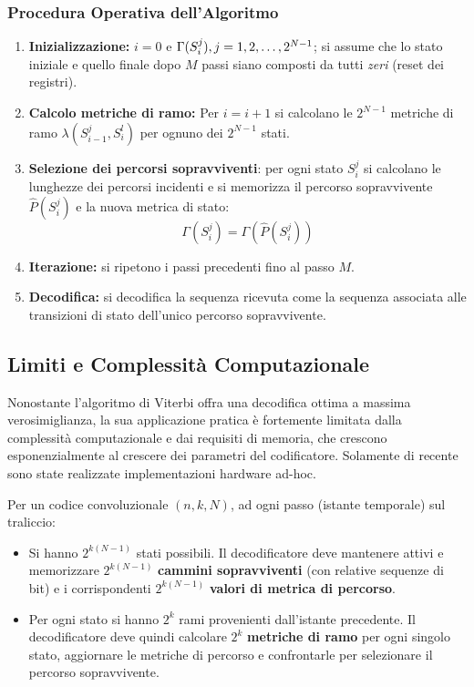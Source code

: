\subsubsection{Procedura Operativa dell'Algoritmo}
\begin{enumerate}
    \item \textbf{Inizializzazione:} $i = 0$ e $\Gamma(S_i^j), \space j=1,2,\dots,2^{N-1}$; si assume che lo stato iniziale e quello finale dopo $M$ passi siano composti da tutti \textit{zeri} (reset dei registri).

    \item \textbf{Calcolo metriche di ramo:} Per $i=i+1$ si calcolano le $2^{N-1}$ metriche di ramo $\lambda(S_{i-1}^j,S_i^l)$ per ognuno dei $2^{N-1}$ stati.

    \item \textbf{Selezione dei percorsi sopravviventi}: per ogni stato $S_i^j$ si calcolano le lunghezze dei percorsi incidenti e si memorizza il percorso sopravvivente $\hat{P}(S_i^j)$ e la nuova metrica di stato:
    $$\Gamma(S_i^j) = \Gamma(\hat{P}(S_i^j))$$

    \item \textbf{Iterazione:} si ripetono i passi precedenti fino al passo $M$.

    \item \textbf{Decodifica:} si decodifica la sequenza ricevuta come la sequenza associata alle transizioni di stato dell'unico percorso sopravvivente.
\end{enumerate}

\subsection{Limiti e Complessità Computazionale}
Nonostante l'algoritmo di Viterbi offra una decodifica ottima a massima verosimiglianza, la sua applicazione pratica è fortemente limitata dalla complessità computazionale e dai requisiti di memoria, che crescono esponenzialmente al crescere dei parametri del codificatore. Solamente di recente sono state realizzate implementazioni hardware ad-hoc.

Per un codice convoluzionale $(n, k, N)$, ad ogni passo (istante temporale) sul traliccio:
\begin{itemize}
    \item Si hanno $2^{k(N-1)}$ stati possibili. Il decodificatore deve mantenere attivi e memorizzare $2^{k(N-1)}$ \textbf{cammini sopravviventi} (con relative sequenze di bit) e i corrispondenti $2^{k(N-1)}$ \textbf{valori di metrica di percorso}.
    \item Per ogni stato si hanno $2^k$ rami provenienti dall'istante precedente. Il decodificatore deve quindi calcolare $2^k$ \textbf{metriche di ramo} per ogni singolo stato, aggiornare le metriche di percorso e confrontarle per selezionare il percorso sopravvivente.
\end{itemize}

